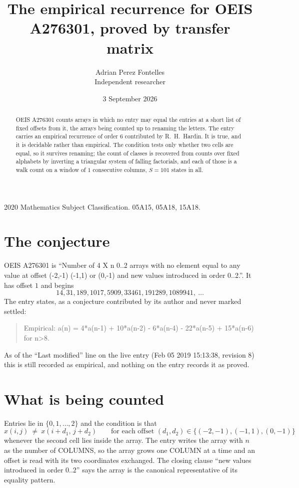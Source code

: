 \documentclass[11pt,a4paper]{article}
\title{The empirical recurrence for OEIS A276301, proved by transfer matrix}
\author{Adrian Perez Fontelles\\ \small Independent researcher}
\date{3 September 2026}
\theoremstyle{plain}
\theoremstyle{definition}
\begin{document}
\maketitle

\begin{abstract}
OEIS A276301 counts arrays in which no entry may equal the entries at a short list of fixed offsets
from it, the arrays being counted up to renaming the letters. The entry carries an empirical
recurrence of order $6$ contributed by R.~H.~Hardin. It is true, and it is decidable
rather than empirical. The condition tests only whether two cells are equal, so it survives
renaming; the count of classes is recovered from counts over fixed alphabets by inverting a
triangular system of falling factorials, and each of those is a walk count on a window of
$1$ consecutive columns, $S=101$ states in all.
\end{abstract}

\noindent\small 2020 Mathematics Subject Classification. 05A15, 05A18, 15A18.\normalsize

\section{The conjecture}

OEIS A276301 is ``Number of 4 X n 0..2 arrays with no element equal to any value at offset (-2,-1) (-1,1) or (0,-1) and new values introduced in order 0..2.''. It has offset $1$ and begins
\[
14, 31, 189, 1017, 5909, 33461, 191289, 1089941,\ \dots
\]
The entry states, as a conjecture contributed by its author and never marked settled:
\begin{quote}
Empirical: a(n) = 4*a(n-1) + 10*a(n-2) - 6*a(n-4) - 22*a(n-5) + 15*a(n-6) for n>8.
\end{quote}
As of the ``Last modified'' line on the live entry (Feb 05 2019 15:13:38, revision 8) this is still
recorded as empirical, and nothing on the entry records it as proved.

\section{What is being counted}

Entries lie in $\{0,1,\dots,2\}$ and the condition is that
\[
x(i,j)\ \ne\ x(i+d_1,\,j+d_2)\qquad\text{for each offset }(d_1,d_2)\in\{(-2,-1), (-1,1), (0,-1)\}
\]
whenever the second cell lies inside the array. The entry writes the array with $n$ as the number of COLUMNS, so the array grows one COLUMN at a time and an offset is read with its two coordinates exchanged. The closing clause ``new values
introduced in order $0..2$'' says the array is the canonical representative of its equality
pattern.
\end{document}
